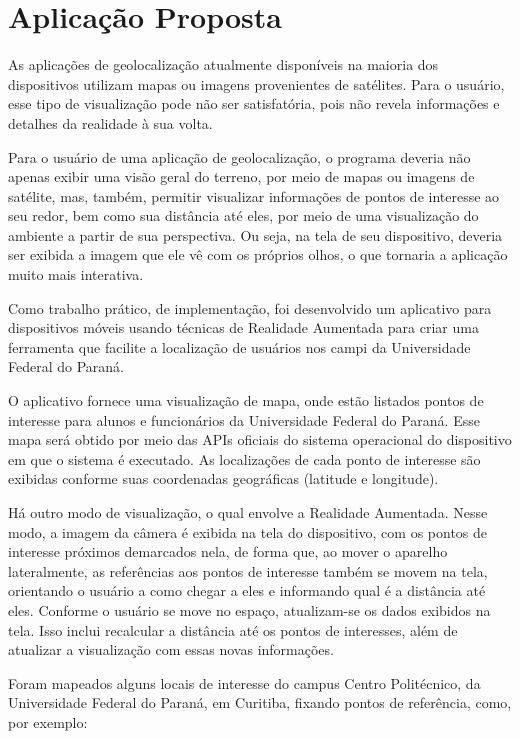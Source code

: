 \chapter{Aplicação Proposta}
\label{chapter:app_proposta}


As aplicações de geolocalização atualmente disponíveis na maioria dos dispositivos utilizam mapas ou imagens
provenientes de satélites. Para o usuário, esse tipo de visualização pode não ser satisfatória, pois não revela
informações e detalhes da realidade à sua volta.

Para o usuário de uma aplicação de geolocalização, o programa deveria não apenas exibir uma visão geral do terreno,
por meio de mapas ou imagens de satélite, mas, também, permitir visualizar informações de pontos de interesse ao
seu redor, bem como sua distância até eles, por meio de uma visualização do ambiente a partir de sua perspectiva. 
Ou seja, na tela de seu dispositivo, deveria ser exibida a imagem que ele vê com os próprios olhos, o que tornaria a
aplicação muito mais interativa.



Como trabalho prático, de implementação, foi desenvolvido um aplicativo
para dispositivos móveis usando técnicas de Realidade Aumentada para criar uma ferramenta
que facilite a localização de usuários nos campi da Universidade Federal do Paraná. 

O aplicativo fornece uma visualização de mapa, onde estão listados pontos de interesse
para alunos e funcionários da Universidade Federal do Paraná. Esse mapa será obtido por meio das
\glspl{API} oficiais do sistema operacional do dispositivo em que
o sistema é executado. As localizações de cada ponto de interesse são exibidas conforme
suas coordenadas geográficas (latitude e longitude).

Há outro modo de visualização, o qual envolve a Realidade Aumentada. Nesse modo,
a imagem da câmera é exibida na tela do dispositivo, com
os pontos de interesse próximos demarcados nela, de forma que, ao mover o aparelho
lateralmente, as referências aos pontos de interesse também se movem na tela, orientando o
usuário a como chegar a eles e informando qual é a distância até eles. Conforme o usuário
se move no espaço, atualizam-se os dados exibidos na tela. Isso inclui recalcular a
distância até os pontos de interesses, além de atualizar a visualização com essas novas
informações.

Foram mapeados alguns locais de interesse do campus Centro Politécnico,
da Universidade Federal do Paraná, em Curitiba, fixando pontos de referência, como, por exemplo:

